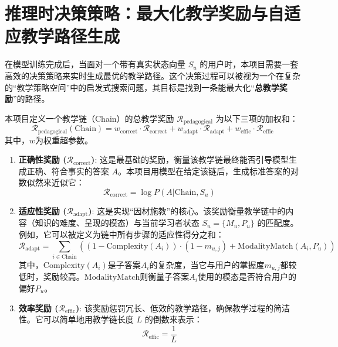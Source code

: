 \section{推理时决策策略：最大化教学奖励与自适应教学路径生成}
在模型训练完成后，当面对一个带有真实状态向量 $S_u$ 的用户时，本项目需要一套高效的决策策略来实时生成最优的教学路径。这个决策过程可以被视为一个在复杂的“教学策略空间”中的启发式搜索问题，其目标是找到一条能最大化“\textbf{总教学奖励}”的路径。

本项目定义一个教学链（Chain）的总教学奖励 $\mathcal{R}_{\text{pedagogical}}$ 为以下三项的加权和：
\begin{equation}
\mathcal{R}_{\text{pedagogical}}(\text{Chain}) = w_{\text{correct}} \cdot \mathcal{R}_{\text{correct}} + w_{\text{adapt}} \cdot \mathcal{R}_{\text{adapt}} + w_{\text{effic}} \cdot \mathcal{R}_{\text{effic}}
\end{equation}
其中，$w$为权重超参数。

\begin{enumerate}
    \item \textbf{正确性奖励 ($\mathcal{R}_{\text{correct}}$)}: 这是最基础的奖励，衡量该教学链最终能否引导模型生成正确、符合事实的答案 $A$。本项目用模型在给定该链后，生成标准答案的对数似然来近似它：
    \begin{equation}
        \mathcal{R}_{\text{correct}} = \log P(A | \text{Chain}, S_u)
    \end{equation}
    
    \item \textbf{适应性奖励 ($\mathcal{R}_{\text{adapt}}$)}: 这是实现“因材施教”的核心。该奖励衡量教学链中的内容（知识的难度、呈现的模态）与当前学习者状态 $S_u = \{M_u, P_u\}$ 的匹配度。例如，它可以被定义为链中所有步骤的适应性得分之和：
    \begin{equation}
        \mathcal{R}_{\text{adapt}} = \sum_{i \in \text{Chain}} \left( (1 - \text{Complexity}(A_i)) \cdot (1 - m_{u,j}) + \text{ModalityMatch}(A_i, P_u) \right)
    \end{equation}
    其中，$\text{Complexity}(A_i)$是子答案$A_i$的复杂度，当它与用户的掌握度$m_{u,j}$都较低时，奖励较高。$\text{ModalityMatch}$则衡量子答案$A_i$使用的模态是否符合用户的偏好$P_u$。
    
    \item \textbf{效率奖励 ($\mathcal{R}_{\text{effic}}$)}: 该奖励惩罚冗长、低效的教学路径，确保教学过程的简洁性。它可以简单地用教学链长度 $L$ 的倒数来表示：
    \begin{equation}
        \mathcal{R}_{\text{effic}} = \frac{1}{L}
    \end{equation}
\end{enumerate}

